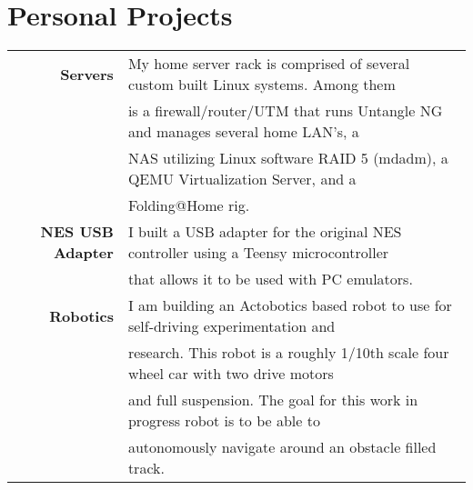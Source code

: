 \documentclass[a4paper,10pt]{article}
\begin{document}
	\section*{Personal Projects}
        \vspace*{1ex}
        \begin{tabular}{rl}
            \textbf{Servers} & My home server rack is comprised of several custom built Linux systems. Among them \\
                             & is a firewall/router/UTM that runs Untangle NG and manages several home LAN's, a \\
                             & NAS utilizing Linux software RAID 5 (mdadm), a QEMU Virtualization Server, and a \\
                             & Folding@Home rig. \\[1ex]
            \textbf{NES USB Adapter} & I built a USB adapter for the original NES controller using a Teensy microcontroller \\
                                     & that allows it to be used with PC emulators. \\[1ex]
            \textbf{Robotics} & I am building an Actobotics based robot to use for self-driving experimentation and \\
                              & research. This robot is a roughly 1/10th scale four wheel car with two drive motors \\
                              & and full suspension. The goal for this work in progress robot is to be able to \\
                              & autonomously navigate around an obstacle filled track. \\[1ex]
        \end{tabular}
\end{document}
